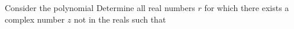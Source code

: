 Consider the polynomial   Determine all real numbers $r$ for which there exists a complex number $z$ not in the reals such that 
